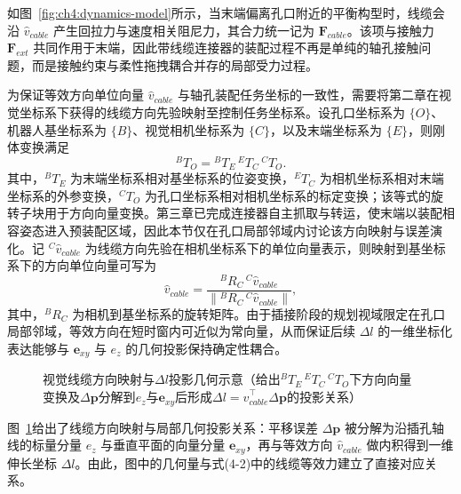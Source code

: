 如图~\ref{fig:ch4:dynamics-model}所示，当末端偏离孔口附近的平衡构型时，线缆会沿 $\hat{v}_{cable}$ 产生回拉力与速度相关阻尼力，其合力统一记为 $\mathbf{F}_{cable}$。该项与接触力 $\mathbf{F}_{ext}$ 共同作用于末端，因此带线缆连接器的装配过程不再是单纯的轴孔接触问题，而是接触约束与柔性拖拽耦合并存的局部受力过程。

为保证等效方向单位向量 $\hat{v}_{cable}$ 与轴孔装配任务坐标的一致性，需要将第二章在视觉坐标系下获得的线缆方向先验映射至控制任务坐标系。设孔口坐标系为 $\{O\}$、机器人基坐标系为 $\{B\}$、视觉相机坐标系为 $\{C\}$，以及末端坐标系为 $\{E\}$，则刚体变换满足
$$
{}^{B}\!T_{O} = {}^{B}\!T_{E}\,{}^{E}\!T_{C}\,{}^{C}\!T_{O}.
$$
其中，${}^{B}\!T_{E}$ 为末端坐标系相对基坐标系的位姿变换，${}^{E}\!T_{C}$ 为相机坐标系相对末端坐标系的外参变换，${}^{C}\!T_{O}$ 为孔口坐标系相对相机坐标系的标定变换；该等式的旋转子块用于方向向量变换。第三章已完成连接器自主抓取与转运，使末端以装配相容姿态进入预装配区域，因此本节仅在孔口局部邻域内讨论该方向映射与误差演化。记 ${}^{C}\!\hat{v}_{cable}$ 为线缆方向先验在相机坐标系下的单位向量表示，则映射到基坐标系下的方向单位向量可写为
$$
\hat v_{cable}=\frac{{}^{B}\!R_{C}\,{}^{C}\!\hat{v}_{cable}}{\left\|{}^{B}\!R_{C}\,{}^{C}\!\hat{v}_{cable}\right\|},
$$
其中，${}^{B}\!R_{C}$ 为相机到基坐标系的旋转矩阵。由于插接阶段的规划视域限定在孔口局部邻域，等效方向在短时窗内可近似为常向量，从而保证后续 $\Delta l$ 的一维坐标化表达能够与 $\mathbf{e}_{xy}$ 与 $e_{z}$ 的几何投影保持确定性耦合。

\begin{figure}[htbp]
  \centering
  \caption{视觉线缆方向映射与$\Delta l$投影几何示意（给出${}^{B}\!T_{E}\,{}^{E}\!T_{C}\,{}^{C}\!T_{O}$下方向向量变换及$\Delta\mathbf{p}$分解到$e_{z}$与$\mathbf{e}_{xy}$后形成$\Delta l=\hat v_{cable}^{\top}\Delta\mathbf{p}$的投影关系）}
  \label{fig:ch4:cable-projection}
\end{figure}

图~\ref{fig:ch4:cable-projection}给出了线缆方向映射与局部几何投影关系：平移误差 $\Delta\mathbf{p}$ 被分解为沿插孔轴线的标量分量 $e_z$ 与垂直平面的向量分量 $\mathbf{e}_{xy}$，再与等效方向 $\hat v_{cable}$ 做内积得到一维伸长坐标 $\Delta l$。由此，图中的几何量与式(4-2)中的线缆等效力建立了直接对应关系。

